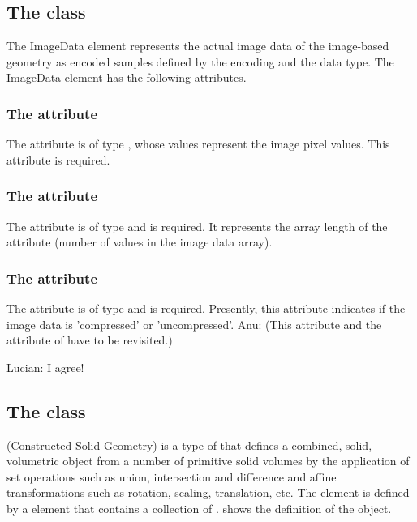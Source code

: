 \subsection{The  class}
\label{ImageData-class}
The ImageData element represents the actual image data of the image-based geometry as encoded samples defined by the encoding and the data type. The ImageData element has the following attributes.

\subsubsection{The  attribute}
The  attribute is of type , whose values represent the image pixel values. This attribute is required.

\subsubsection{The  attribute}
The  attribute is of type  and is required. It represents the array length of the  attribute (number of values in the image data array).

\subsubsection{The  attribute}
The  attribute is of type  and is required. Presently, this attribute indicates if the image data is 'compressed' or 'uncompressed'.  {\color{red} Anu: \notice (This attribute and the  attribute of \SampledField have to be revisited.)}

{\color{red} Lucian: \notice I agree!}

\subsection{The  class}
\label{CSGeometry-class}
\label{ListOfCSGObjects-class}
\CSGeometry (Constructed Solid Geometry) is a type of \GeometryDefinition that defines a combined, solid, volumetric object from a number of primitive solid volumes by the application of set operations such as union, intersection and difference and affine transformations such as rotation, scaling, translation, etc. The \CSGeometry element is defined by a  element that contains a collection of \CSGObjects.  shows the definition of the \CSGeometry object.

